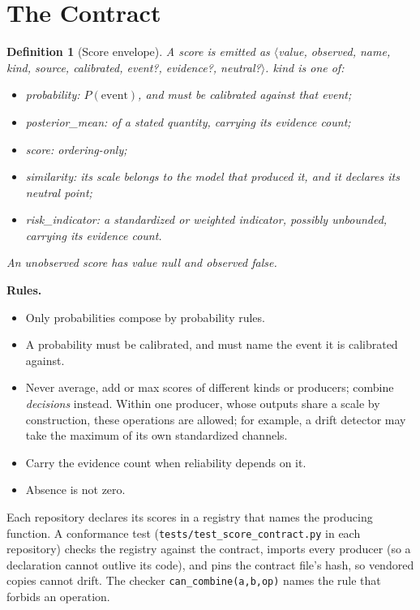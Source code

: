 \documentclass[conference]{IEEEtran}
\newtheorem{definition}{Definition}
\begin{document}
\section{The Contract}
\begin{definition}[Score envelope]
A score is emitted as $\langle$value, observed, name, kind, source, calibrated, event?, evidence?, neutral?$\rangle$. \emph{kind} is one of:
\begin{itemize}
\item \emph{probability}: $P(\text{event})$, and must be calibrated against that event;
\item \emph{posterior\_mean}: of a stated quantity, carrying its evidence count;
\item \emph{score}: ordering-only;
\item \emph{similarity}: its scale belongs to the model that produced it, and it declares its neutral point;
\item \emph{risk\_indicator}: a standardized or weighted indicator, possibly unbounded, carrying its evidence count.
\end{itemize}
An unobserved score has value null and observed false.
\end{definition}

\textbf{Rules.}
\begin{itemize}
\item[R1] Only probabilities compose by probability rules.
\item[R2] A probability must be calibrated, and must name the event it is calibrated against.
\item[R3] Never average, add or max scores of different kinds or producers; combine \emph{decisions} instead. Within one producer, whose outputs share a scale by construction, these operations are allowed; for example, a drift detector may take the maximum of its own standardized channels.
\item[R4] Carry the evidence count when reliability depends on it.
\item[R5] Absence is not zero.
\end{itemize}

Each repository declares its scores in a registry that names the producing function. A conformance test (\texttt{tests/test\_score\_contract.py} in each repository) checks the registry against the contract, imports every producer (so a declaration cannot outlive its code), and pins the contract file's hash, so vendored copies cannot drift. The checker \texttt{can\_combine(a,b,op)} names the rule that forbids an operation.
\end{document}
